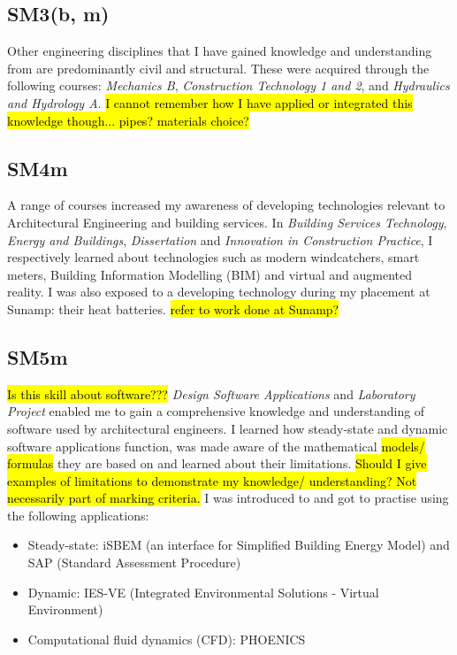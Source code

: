 \subsection*{SM3(b, m)}

Other engineering disciplines that I have gained knowledge and understanding from are predominantly civil and structural.
These were acquired through the following courses: \textit{Mechanics B}, \textit{Construction Technology 1 and 2},  and \textit{Hydraulics and Hydrology A}.
\hl{I cannot remember how I have applied or integrated this knowledge though...
pipes?
materials choice?}


\subsection*{SM4m}

A range of courses increased my awareness of developing technologies relevant to Architectural Engineering and building services.
In \textit{Building Services Technology}, \textit{Energy and Buildings}, \textit{Dissertation} and \textit{Innovation in Construction Practice}, I respectively learned about technologies such as modern windcatchers, smart meters, Building Information Modelling (BIM) and virtual and augmented reality.
I was also exposed to a developing technology during my placement at Sunamp: their heat batteries.
\hl{refer to work done at Sunamp?}


\subsection*{SM5m}

\hl{Is this skill about software???}
\textit{Design Software Applications} and \textit{Laboratory Project} enabled me to gain a comprehensive knowledge and understanding of software used by architectural engineers.
I learned how steady-state and dynamic software applications function, was made aware of the mathematical \hl{models/ formulas} they are based on and learned about their limitations.
\hl{Should I give examples of limitations to demonstrate my knowledge/ understanding? Not necessarily part of marking criteria.}
I was introduced to and got to practise using the following applications:
\begin{itemize}
    \item Steady-state: iSBEM (an interface for Simplified Building Energy Model) and SAP (Standard Assessment Procedure)
    \item Dynamic: IES-VE (Integrated Environmental Solutions - Virtual Environment)
    \item Computational fluid dynamics (CFD): PHOENICS
\end{itemize}

